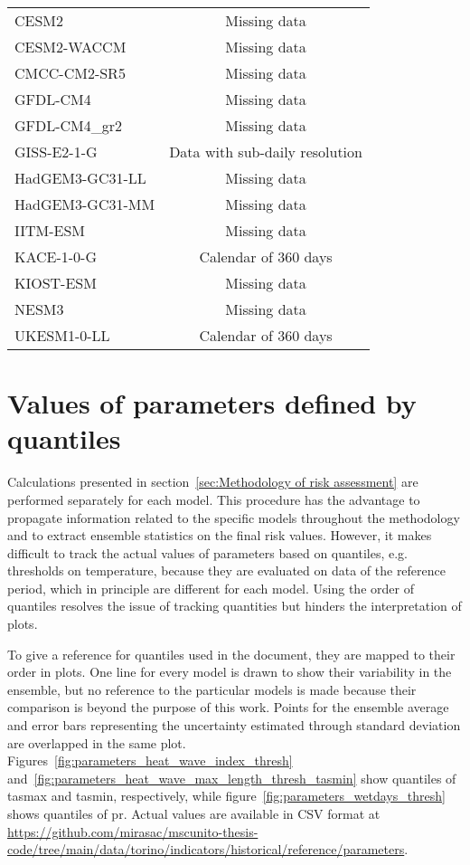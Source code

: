 \begin{table}
\begin{tabular}{lc}
    \hline
    CESM2            & Missing data                   \\
    CESM2-WACCM      & Missing data                   \\
    CMCC-CM2-SR5     & Missing data                   \\
    GFDL-CM4         & Missing data                   \\
    GFDL-CM4\_gr2    & Missing data                   \\
    GISS-E2-1-G      & Data with sub-daily resolution \\
    HadGEM3-GC31-LL  & Missing data                   \\
    HadGEM3-GC31-MM  & Missing data                   \\
    IITM-ESM         & Missing data                   \\
    KACE-1-0-G       & Calendar of 360 days           \\
    KIOST-ESM        & Missing data                   \\
    NESM3            & Missing data                   \\
    UKESM1-0-LL      & Calendar of 360 days           \\
  \end{tabular}
\end{table}



\section{Values of parameters defined by quantiles}
\label{sec:Values of parameters defined by quantiles}
Calculations presented in section~\ref{sec:Methodology of risk assessment} are performed separately for each model. This procedure has the advantage to propagate information related to the specific models throughout the methodology and to extract ensemble statistics on the final risk values.
However, it makes difficult to track the actual values of parameters based on quantiles, e.g. thresholds on temperature, because they are evaluated on data of the reference period, which in principle are different for each model. Using the order of quantiles resolves the issue of tracking quantities but hinders the interpretation of plots.

To give a reference for quantiles used in the document, they are mapped to their order in plots. One line for every model is drawn to show their variability in the ensemble, but no reference to the particular models is made because their comparison is beyond the purpose of this work. Points for the ensemble average and error bars representing the uncertainty estimated through standard deviation are overlapped in the same plot. Figures~\ref{fig:parameters_heat_wave_index_thresh} and~\ref{fig:parameters_heat_wave_max_length_thresh_tasmin} show quantiles of \gls{tasmax} and \gls{tasmin}, respectively, while figure~\ref{fig:parameters_wetdays_thresh} shows quantiles of \gls{pr}. Actual values are available in CSV format at \url{https://github.com/mirasac/mscunito-thesis-code/tree/main/data/torino/indicators/historical/reference/parameters}.

